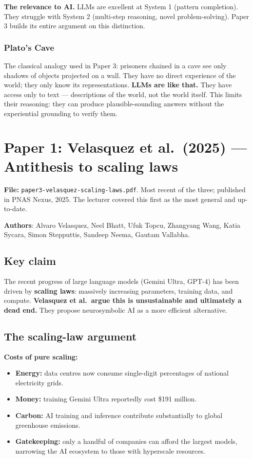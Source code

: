 \documentclass[11pt, a4paper]{article}
\begin{document}
\textbf{The relevance to AI.} LLMs are excellent at System 1 (pattern completion). They struggle with System 2 (multi-step reasoning, novel problem-solving). Paper 3 builds its entire argument on this distinction.

\subsubsection*{Plato's Cave}

The classical analogy used in Paper 3: prisoners chained in a cave see only shadows of objects projected on a wall. They have no direct experience of the world; they only know its representations. \textbf{LLMs are like that.} They have access only to text — descriptions of the world, not the world itself. This limits their reasoning: they can produce plausible-sounding answers without the experiential grounding to verify them.

\section{Paper 1: Velasquez et al.\ (2025) — Antithesis to scaling laws}

\textbf{File:} \texttt{paper3-velasquez-scaling-laws.pdf}. Most recent of the three; published in PNAS Nexus, 2025. The lecturer covered this first as the most general and up-to-date.

\textbf{Authors}: Alvaro Velasquez, Neel Bhatt, Ufuk Topcu, Zhangyang Wang, Katia Sycara, Simon Stepputtis, Sandeep Neema, Gautam Vallabha.

\subsection{Key claim}

The recent progress of large language models (Gemini Ultra, GPT-4) has been driven by \textbf{scaling laws}: massively increasing parameters, training data, and compute. \textbf{Velasquez et al.\ argue this is unsustainable and ultimately a dead end.} They propose neurosymbolic AI as a more efficient alternative.

\subsection{The scaling-law argument}

\textbf{Costs of pure scaling:}
\begin{itemize}
  \item \textbf{Energy:} data centres now consume single-digit percentages of national electricity grids.
  \item \textbf{Money:} training Gemini Ultra reportedly cost \$191 million.
  \item \textbf{Carbon:} AI training and inference contribute substantially to global greenhouse emissions.
  \item \textbf{Gatekeeping:} only a handful of companies can afford the largest models, narrowing the AI ecosystem to those with hyperscale resources.
\end{itemize}
\end{document}
